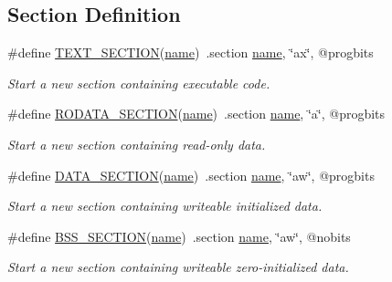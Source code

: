 \subsection*{Section Definition}
\begin{DoxyCompactItemize}
\item 
\#define \hyperlink{group__assembler__group_ga8e8471b5cb4a0e8bc8cefb35cc8ebb3d}{T\-E\-X\-T\-\_\-\-S\-E\-C\-T\-I\-O\-N}(\hyperlink{gas_8h_a8cc72c7acb2e8c5a34a460a505fece93}{name})~.section \hyperlink{gas_8h_a8cc72c7acb2e8c5a34a460a505fece93}{name}, \char`\"{}ax\char`\"{}, @progbits
\begin{DoxyCompactList}\small\item\em Start a new section containing executable code. \end{DoxyCompactList}\item 
\#define \hyperlink{group__assembler__group_gadd34e4da24622d99c3b28211c28cac68}{R\-O\-D\-A\-T\-A\-\_\-\-S\-E\-C\-T\-I\-O\-N}(\hyperlink{gas_8h_a8cc72c7acb2e8c5a34a460a505fece93}{name})~.section \hyperlink{gas_8h_a8cc72c7acb2e8c5a34a460a505fece93}{name}, \char`\"{}a\char`\"{}, @progbits
\begin{DoxyCompactList}\small\item\em Start a new section containing read-\/only data. \end{DoxyCompactList}\item 
\#define \hyperlink{group__assembler__group_ga2d1becf75eb73256b236ed19b28f76bf}{D\-A\-T\-A\-\_\-\-S\-E\-C\-T\-I\-O\-N}(\hyperlink{gas_8h_a8cc72c7acb2e8c5a34a460a505fece93}{name})~.section \hyperlink{gas_8h_a8cc72c7acb2e8c5a34a460a505fece93}{name}, \char`\"{}aw\char`\"{}, @progbits
\begin{DoxyCompactList}\small\item\em Start a new section containing writeable initialized data. \end{DoxyCompactList}\item 
\#define \hyperlink{group__assembler__group_ga9c174ffe0958450a515a04007564fc19}{B\-S\-S\-\_\-\-S\-E\-C\-T\-I\-O\-N}(\hyperlink{gas_8h_a8cc72c7acb2e8c5a34a460a505fece93}{name})~.section \hyperlink{gas_8h_a8cc72c7acb2e8c5a34a460a505fece93}{name}, \char`\"{}aw\char`\"{}, @nobits
\begin{DoxyCompactList}\small\item\em Start a new section containing writeable zero-\/initialized data. \end{DoxyCompactList}\end{DoxyCompactItemize}


